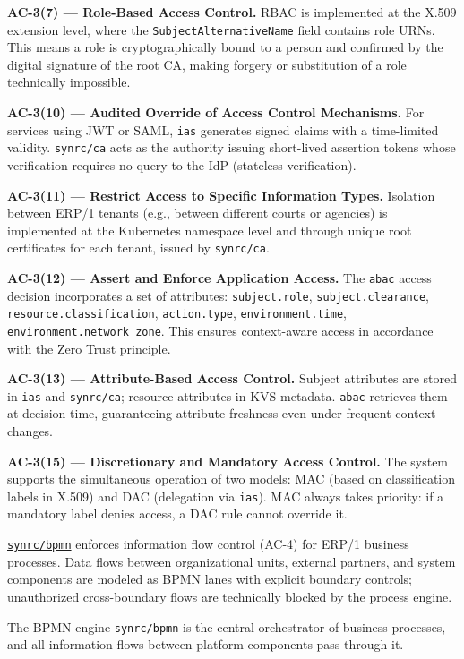 \documentclass{article}
\begin{document}
\textbf{AC-3(7) --- Role-Based Access Control.}
RBAC is implemented at the X.509 extension level, where the \texttt{SubjectAlternativeName} field contains role URNs. This means a role is cryptographically bound to a person and confirmed by the digital signature of the root CA, making forgery or substitution of a role technically impossible.

\textbf{AC-3(10) --- Audited Override of Access Control Mechanisms.}
For services using JWT or SAML, \texttt{ias} generates signed claims with a time-limited validity. \texttt{synrc/ca} acts as the authority issuing short-lived assertion tokens whose verification requires no query to the IdP (stateless verification).

\textbf{AC-3(11) --- Restrict Access to Specific Information Types.}
Isolation between ERP/1 tenants (e.g., between different courts or agencies) is implemented at the Kubernetes namespace level and through unique root certificates for each tenant, issued by \texttt{synrc/ca}.

\textbf{AC-3(12) --- Assert and Enforce Application Access.}
The \texttt{abac} access decision incorporates a set of attributes: \texttt{subject.role}, \texttt{subject.clearance}, \texttt{resource.classification}, \texttt{action.type}, \texttt{environment.time}, \texttt{environment.network\_zone}. This ensures context-aware access in accordance with the Zero Trust principle.

\textbf{AC-3(13) --- Attribute-Based Access Control.}
Subject attributes are stored in \texttt{ias} and \texttt{synrc/ca}; resource attributes in KVS metadata. \texttt{abac} retrieves them at decision time, guaranteeing attribute freshness even under frequent context changes.

\textbf{AC-3(15) --- Discretionary and Mandatory Access Control.}
The system supports the simultaneous operation of two models: MAC (based on classification labels in X.509) and DAC (delegation via \texttt{ias}). MAC always takes priority: if a mandatory label denies access, a DAC rule cannot override it.

\href{https://github.com/synrc/bpmn}{\texttt{synrc/bpmn}} enforces information flow control (AC-4) for ERP/1 business processes. Data flows between organizational units, external partners, and system components are modeled as BPMN lanes with explicit boundary controls; unauthorized cross-boundary flows are technically blocked by the process engine.

The BPMN engine \texttt{synrc/bpmn} is the central orchestrator of business processes, and all information flows between platform components pass through it.
\end{document}
